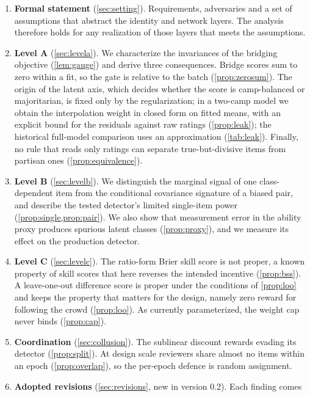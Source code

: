 \begin{enumerate}
  \item \textbf{Formal statement} (\cref{sec:setting}). Requirements, adversaries and a set
    of assumptions that abstract the identity and network layers. The analysis therefore
    holds for any realization of those layers that meets the assumptions.
  \item \textbf{Level A} (\cref{sec:levela}). We characterize the invariances of the
    bridging objective (\cref{lem:gauge}) and derive three consequences. Bridge scores sum to
    zero within a fit, so the gate is relative to the batch (\cref{prop:zerosum}). The origin
    of the latent axis, which decides whether the score is camp-balanced or majoritarian, is
    fixed only by the regularization; in a two-camp model we obtain the interpolation weight
    in closed form on fitted means, with an explicit bound for the residuals against raw ratings
    (\cref{prop:leak}); the historical full-model comparison uses an approximation
    (\cref{tab:leak}).
    Finally, no rule that reads only ratings can separate true-but-divisive items from
    partisan ones (\cref{prop:equivalence}).
  \item \textbf{Level B} (\cref{sec:levelb}). We distinguish the marginal signal of one class-dependent item from
    the conditional covariance signature of a biased pair, and describe the tested detector's
    limited single-item power (\cref{prop:single,prop:pair}). We also show that measurement error in the
    ability proxy produces spurious latent classes (\cref{prop:proxy}), and we measure its
    effect on the production detector.
  \item \textbf{Level C} (\cref{sec:levelc}). The ratio-form Brier skill score is not proper,
    a known property of skill scores that here reverses the intended incentive (\cref{prop:bss}). A leave-one-out difference score is proper under the conditions of \cref{prop:loo} and keeps the property that
    matters for the design, namely zero reward for following the crowd (\cref{prop:loo}).
    As currently parameterized, the weight cap never binds (\cref{prop:cap}).
  \item \textbf{Coordination} (\cref{sec:collusion}). The sublinear discount rewards evading
    its detector (\cref{prop:split}). At design scale reviewers share almost no items within
    an epoch (\cref{prop:overlap}), so the per-epoch defence is random assignment.
  \item \textbf{Adopted revisions} (\cref{sec:revisions}, new in version 0.2). Each finding comes

\end{enumerate}
